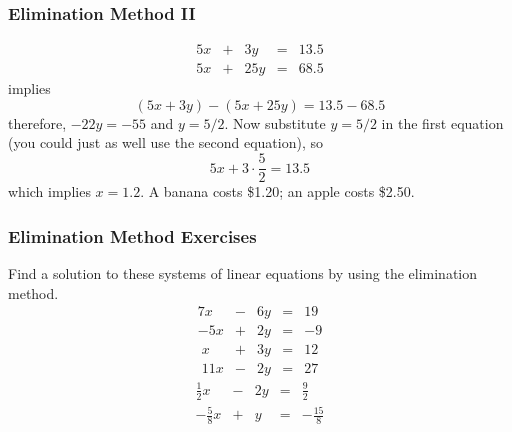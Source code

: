 \documentclass[xcolor=dvipsnames]{beamer}
\begin{document}
\begin{frame}
  \frametitle{Elimination Method II}
  \begin{equation}
    \label{eq:zeegheir}
    \begin{array}{rcrcl}
      5x&+&3y&=&13.5 \\
      5x&+&25y&=&68.5
    \end{array}
  \end{equation}
implies
  \begin{equation}
    \label{eq:ooleeyae}
(5x+3y)-(5x+25y)=13.5-68.5
  \end{equation}
therefore, $-22y=-55$ and $y=5/2$. Now substitute $y=5/2$ in the first
equation (you could just as well use the second equation), so
\begin{equation}
  \label{eq:ieghoisa}
  5x+3\cdot\frac{5}{2}=13.5
\end{equation}
which implies $x=1.2$. A banana costs \$1.20; an apple costs \$2.50.
\end{frame}

\begin{frame}
  \frametitle{Elimination Method Exercises}
Find a solution to these systems of linear equations by using the
elimination method.
  \begin{equation}
    \label{eq:eighilai}
    \begin{array}{rcrcl}
      7x&-&6y&=&19 \\
      -5x&+&2y&=&-9
    \end{array}
  \end{equation}
  \begin{equation}
    \label{eq:thidaitu}
    \begin{array}{rcrcl}
      x&+&3y&=&12 \\
      11x&-&2y&=&27
    \end{array}
  \end{equation}
  \begin{equation}
    \label{eq:ohkaicux}
    \begin{array}{rcrcl}
      \frac{1}{2}x&-&2y&=&\frac{9}{2} \\
      -\frac{5}{8}x&+&y&=&-\frac{15}{8}
    \end{array}
  \end{equation}
\end{frame}
\end{document}
